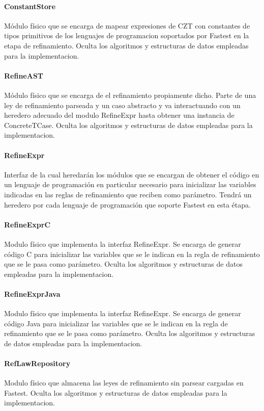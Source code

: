\documentclass[a4paper,10pt]{report}
\begin{document}
				\paragraph{ConstantStore}
				Módulo físico que se encarga de mapear expresiones de CZT con constantes de tipos primitivos de los lenguajes de programacion soportados por Fastest en la etapa de refinamiento.
				Oculta los algoritmos y estructuras de datos empleadas para la implementacion.
				\paragraph{RefineAST}
				Módulo físico que se encarga de el refinamiento propiamente dicho. Parte de una ley de refinamiento parseada y un caso abstracto y va interactuando con un heredero adecuado del modulo RefineExpr hasta obtener una instancia de ConcreteTCase.
				Oculta los algoritmos y estructuras de datos empleadas para la implementacion.
				\paragraph{RefineExpr}
				Interfaz de la cual heredarán los módulos que se encargan de obtener el código en un lenguaje de programación en particular necesario para inicializar las variables indicadas en las reglas de refinamiento que reciben como parámetro. Tendrá un heredero por cada lenguaje de programación que soporte Fastest en esta étapa.
				\paragraph{RefineExprC}
				Modulo físico que implementa la interfaz RefineExpr. Se encarga de generar código C para inicializar las variables que se le indican en la regla de refinamiento que se le pasa como parámetro.
				Oculta los algoritmos y estructuras de datos empleadas para la implementacion.
				\paragraph{RefineExprJava}
				Modulo físico que implementa la interfaz RefineExpr. Se encarga de generar código Java para inicializar las variables que se le indican en la regla de refinamiento que se le pasa como parámetro.
				Oculta los algoritmos y estructuras de datos empleadas para la implementacion.
				\paragraph{RefLawRepository}
				Modulo físico que almacena las leyes de refinamiento sin parsear cargadas en Fastest.
				Oculta los algoritmos y estructuras de datos empleadas para la implementacion.
\end{document}
